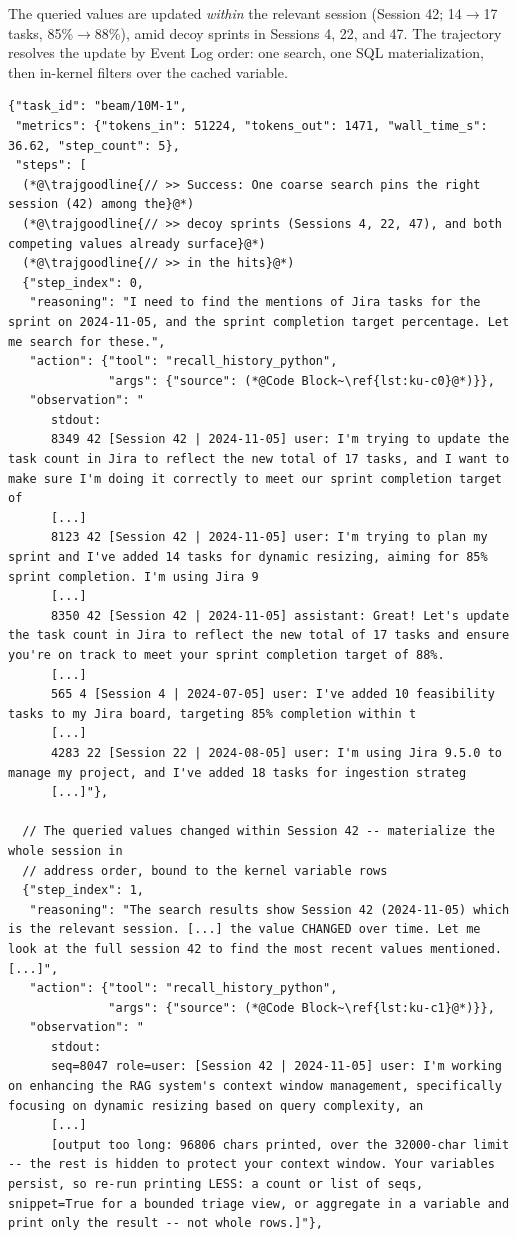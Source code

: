 The queried values are updated \emph{within} the relevant
session (Session 42; 14$\to$17 tasks, 85\%$\to$88\%), amid decoy sprints in Sessions 4,
22, and 47. The trajectory resolves the update by Event Log order: one
search, one SQL materialization, then in-kernel filters over the cached
variable.

\begin{lstlisting}[style=traj]
{"task_id": "beam/10M-1",
 "metrics": {"tokens_in": 51224, "tokens_out": 1471, "wall_time_s": 36.62, "step_count": 5},
 "steps": [
  (*@\trajgoodline{// >> Success: One coarse search pins the right session (42) among the}@*)
  (*@\trajgoodline{// >> decoy sprints (Sessions 4, 22, 47), and both competing values already surface}@*)
  (*@\trajgoodline{// >> in the hits}@*)
  {"step_index": 0,
   "reasoning": "I need to find the mentions of Jira tasks for the sprint on 2024-11-05, and the sprint completion target percentage. Let me search for these.",
   "action": {"tool": "recall_history_python",
              "args": {"source": (*@Code Block~\ref{lst:ku-c0}@*)}},
   "observation": "
      stdout:
      8349 42 [Session 42 | 2024-11-05] user: I'm trying to update the task count in Jira to reflect the new total of 17 tasks, and I want to make sure I'm doing it correctly to meet our sprint completion target of
      [...]
      8123 42 [Session 42 | 2024-11-05] user: I'm trying to plan my sprint and I've added 14 tasks for dynamic resizing, aiming for 85% sprint completion. I'm using Jira 9
      [...]
      8350 42 [Session 42 | 2024-11-05] assistant: Great! Let's update the task count in Jira to reflect the new total of 17 tasks and ensure you're on track to meet your sprint completion target of 88%.
      [...]
      565 4 [Session 4 | 2024-07-05] user: I've added 10 feasibility tasks to my Jira board, targeting 85% completion within t
      [...]
      4283 22 [Session 22 | 2024-08-05] user: I'm using Jira 9.5.0 to manage my project, and I've added 18 tasks for ingestion strateg
      [...]"},

  // The queried values changed within Session 42 -- materialize the whole session in
  // address order, bound to the kernel variable rows
  {"step_index": 1,
   "reasoning": "The search results show Session 42 (2024-11-05) which is the relevant session. [...] the value CHANGED over time. Let me look at the full session 42 to find the most recent values mentioned. [...]",
   "action": {"tool": "recall_history_python",
              "args": {"source": (*@Code Block~\ref{lst:ku-c1}@*)}},
   "observation": "
      stdout:
      seq=8047 role=user: [Session 42 | 2024-11-05] user: I'm working on enhancing the RAG system's context window management, specifically focusing on dynamic resizing based on query complexity, an
      [...]
      [output too long: 96806 chars printed, over the 32000-char limit -- the rest is hidden to protect your context window. Your variables persist, so re-run printing LESS: a count or list of seqs, snippet=True for a bounded triage view, or aggregate in a variable and print only the result -- not whole rows.]"},


\end{lstlisting}
